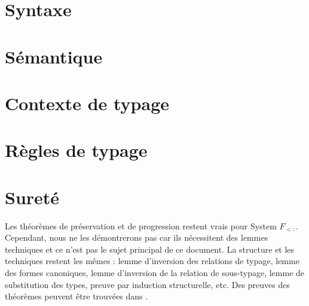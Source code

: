 \section{Syntaxe}


\section{Sémantique}

\section{Contexte de typage}

\section{Règles de typage}

\section{Sureté}

Les théorèmes de préservation et de progression restent vrais pour System
$F_{<:}$. Cependant, nous ne les démontrerons pas car ils nécessitent des lemmes
techniques et ce n'est pas le sujet principal de ce document. La structure
et les techniques restent les mêmes : lemme d'inversion des relations de typage,
lemme des formes canoniques, lemme d'inversion de la relation de sous-typage, lemme de
substitution des types, preuve par induction structurelle, etc.
Des preuves des théorèmes peuvent être trouvées dans
\cite{tapl-bounded-quantification}.